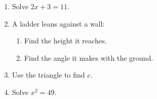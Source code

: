 \documentclass{article}\usepackage{tikz,enumitem}
\begin{document}
\begin{enumerate}[leftmargin=*, itemsep=3cm]
  \item Solve $2x + 3 = 11$.
  \item A ladder leans against a wall:
    \begin{enumerate}[label=(\alph*), itemsep=3cm]
      \item Find the height it reaches.
      \item Find the angle it makes with the ground.
    \end{enumerate}
  \item Use the triangle to find $c$.
  \item Solve $x^2 = 49$.
\end{enumerate}
\end{document}
